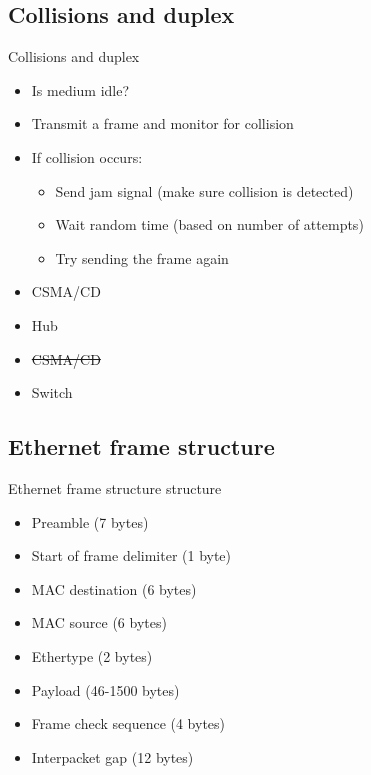 \subsection{Collisions and duplex}
\begin{frame}{Collisions and duplex}
	\pause
	\begin{itemize}[<+->]
		\item Is medium idle?
		\item Transmit a frame and monitor for collision
		\item If collision occurs:
		\begin{itemize}
			\item Send jam signal (make sure collision is detected)
			\item Wait random time (based on number of attempts)
			\item Try sending the frame again
		\end{itemize}
	\end{itemize}
	\pause
	\begin{itemize}[<+->]
		\item CSMA/CD
		\item Hub
	\end{itemize}
	\pause
	\begin{itemize}[<+->]
		\item \sout{CSMA/CD}
		\item Switch
	\end{itemize}
\end{frame}

\subsection{Ethernet frame structure}
\begin{frame}{Ethernet frame structure}
	 structure\pause
	\begin{itemize}[<+->]
		\item Preamble (7 bytes)
		\item Start of frame delimiter (1 byte)
		\item MAC destination (6 bytes)
		\item MAC source (6 bytes)
		\item Ethertype (2 bytes)
		\item Payload (46-1500 bytes)
		\item Frame check sequence (4 bytes)
		\item Interpacket gap (12 bytes)
	\end{itemize}
\end{frame}

